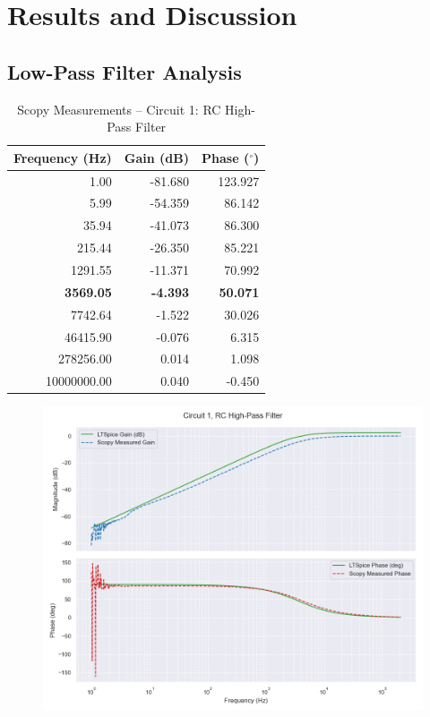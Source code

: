 \documentclass[12pt]{article}
\begin{document}
\section{Results and Discussion}
\subsection{Low-Pass Filter Analysis}

\begin{table}[H]
	\centering
	\caption{Scopy Measurements – Circuit 1: RC High-Pass Filter}
	\begin{tabular}{|r|r|r|}
		\hline
		\textbf{Frequency (Hz)} & \textbf{Gain (dB)} & \textbf{Phase ($^\circ$)} \\
		\hline
		1.00                    & -81.680            & 123.927                   \\
		5.99                    & -54.359            & 86.142                    \\
		35.94                   & -41.073            & 86.300                    \\
		215.44                  & -26.350            & 85.221                    \\
		1291.55                 & -11.371            & 70.992                    \\
		\textbf{3569.05}        & \textbf{-4.393}    & \textbf{50.071}           \\
		7742.64                 & -1.522             & 30.026                    \\
		46415.90                & -0.076             & 6.315                     \\
		278256.00               & 0.014              & 1.098                     \\
		10000000.00             & 0.040              & -0.450                    \\
		\hline
	\end{tabular}
\end{table}
\begin{figure}[H]
	\includegraphics[width=\textwidth]{e6_bode1}
\end{figure}
\end{document}

